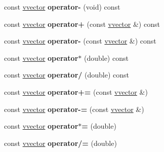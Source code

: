 \begin{DoxyCompactItemize}
\item 
const \hyperlink{classvvector}{vvector} {\bfseries operator-\/} (void) const \hypertarget{classvvector_a0bf25a01648828f90d937db026e446d9}{}\label{classvvector_a0bf25a01648828f90d937db026e446d9}

\item 
const \hyperlink{classvvector}{vvector} {\bfseries operator+} (const \hyperlink{classvvector}{vvector} \&) const \hypertarget{classvvector_a44fc112af33ddaecf2bafb42b4d85092}{}\label{classvvector_a44fc112af33ddaecf2bafb42b4d85092}

\item 
const \hyperlink{classvvector}{vvector} {\bfseries operator-\/} (const \hyperlink{classvvector}{vvector} \&) const \hypertarget{classvvector_a20638fba6f2b90f6a2cb520a7cf8ecbd}{}\label{classvvector_a20638fba6f2b90f6a2cb520a7cf8ecbd}

\item 
const \hyperlink{classvvector}{vvector} {\bfseries operator$\ast$} (double) const \hypertarget{classvvector_ab0ed3e2ad4124e609075c0c584f2aedc}{}\label{classvvector_ab0ed3e2ad4124e609075c0c584f2aedc}

\item 
const \hyperlink{classvvector}{vvector} {\bfseries operator/} (double) const \hypertarget{classvvector_a4189c945d0eec83072decff9481edaca}{}\label{classvvector_a4189c945d0eec83072decff9481edaca}

\item 
const \hyperlink{classvvector}{vvector} {\bfseries operator+=} (const \hyperlink{classvvector}{vvector} \&)\hypertarget{classvvector_ade7f59bbd439daa67edc582d26c8dfc5}{}\label{classvvector_ade7f59bbd439daa67edc582d26c8dfc5}

\item 
const \hyperlink{classvvector}{vvector} {\bfseries operator-\/=} (const \hyperlink{classvvector}{vvector} \&)\hypertarget{classvvector_ae1cd890debc1a42ca5491903c9cb191e}{}\label{classvvector_ae1cd890debc1a42ca5491903c9cb191e}

\item 
const \hyperlink{classvvector}{vvector} {\bfseries operator$\ast$=} (double)\hypertarget{classvvector_a2cd78d4f19e76cdb456aa1d6d1dca097}{}\label{classvvector_a2cd78d4f19e76cdb456aa1d6d1dca097}

\item 
const \hyperlink{classvvector}{vvector} {\bfseries operator/=} (double)\hypertarget{classvvector_a4a3e81bd8bbd119921a307aba36c4ebc}{}\label{classvvector_a4a3e81bd8bbd119921a307aba36c4ebc}


\end{DoxyCompactItemize}

